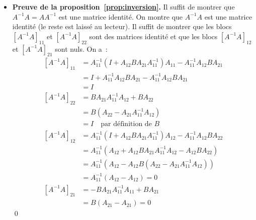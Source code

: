 \documentclass[10pt,a4paper]{article}
\theoremstyle{definition}
\begin{document}
\begin{notes}

  \begin{itemize}

  \item \textbf{Preuve de la proposition~\ref{prop:inversion}.} Il suffit de montrer que $A^{-1}A = AA^{-1}$ est une matrice identité. On montre que $A^{-1}A$ est une matrice identité (le reste est laissé au lecteur). Il suffit de montrer que les blocs $\left[ A^{-1}A \right]_{11}$ et $\left[ A^{-1}A \right]_{22}$ sont des matrices identité et que les blocs $\left[ A^{-1}A \right]_{12}$ et $\left[ A^{-1}A \right]_{21}$ sont nuls. On a~:
    \[
      \begin{split}
        \left[A^{-1}A\right]_{11} &= A_{11}^{-1}\left( I + A_{12}BA_{21}A_{11}^{-1} \right)A_{11}-A_{11}^{-1}A_{12}BA_{21}\\
                                  &= I + A_{11}^{-1}A_{12}BA_{21}-A_{11}^{-1}A_{12}BA_{21}\\
                                  &= I\\
        \left[ A^{-1}A \right]_{22} &= BA_{21}A_{11}^{-1}A_{12}+BA_{22}\\
                                  &= B\left( A_{22}- A_{21}A_{11}^{-1}A_{12}\right)\\
                                  &= I\quad\text{par définition de }B\\
        \left[ A^{-1}A \right]_{12} &= A_{11}^{-1}\left( I + A_{12}BA_{21}A_{11}^{-1} \right)A_{12} - A_{11}^{-1}A_{12}BA_{22}\\
                                  &= A_{11}^{-1}\left( A_{12} + A_{12}BA_{21}A_{11}^{-1}A_{12} - A_{12} B A_{22}  \right)\\
                                  &= A_{11}^{-1}\left( A_{12} - A_{12}B \left(A_{22}- A_{21}A_{11}^{-1}A_{12} \right) \right)\\
                                  &= A_{11}^{-1}\left( A_{12} - A_{12}\right) = 0\\
        \left[A^{-1}A\right]_{21} &= -BA_{21}A_{11}^{-1}A_{11}+BA_{21}\\
                                  &= B\left( A_{21}- A_{21}\right) = 0
      \end{split}
    \]
    \qed
  \end{itemize}

\end{notes}
\end{document}
